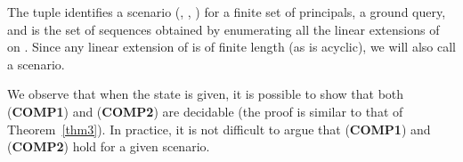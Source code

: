 \documentclass[conference]{llncs}
\newcommand{\CRO}{CRO}
\begin{document}
{The tuple
 identifies a scenario (, , ) for
 a finite set of principals,  a ground query, and  is
the set of sequences obtained by enumerating all the linear extensions
of  on .  
Since any linear extension of  is of finite length (as
 is acyclic), we will also call  a
scenario.

We observe that when the state  is given, it is possible to show
that both (\textbf{COMP1}) and (\textbf{COMP2}) are decidable (the
proof is similar to that of Theorem~\ref{thm3}).  In practice, it is
not difficult to argue that (\textbf{COMP1}) and (\textbf{COMP2}) hold
for a given scenario.  

}
\end{document}
